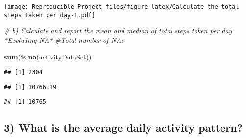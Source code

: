 \documentclass[
]{article}
\newenvironment{Shaded}{\begin{snugshade}}{\end{snugshade}}
\newcommand{\CommentTok}[1]{\textcolor[rgb]{0.56,0.35,0.01}{\textit{#1}}}
\newcommand{\DataTypeTok}[1]{\textcolor[rgb]{0.13,0.29,0.53}{#1}}
\newcommand{\KeywordTok}[1]{\textcolor[rgb]{0.13,0.29,0.53}{\textbf{#1}}}
\newcommand{\NormalTok}[1]{#1}
\newcommand{\OperatorTok}[1]{\textcolor[rgb]{0.81,0.36,0.00}{\textbf{#1}}}
\newcommand{\OtherTok}[1]{\textcolor[rgb]{0.56,0.35,0.01}{#1}}
\newcommand{\StringTok}[1]{\textcolor[rgb]{0.31,0.60,0.02}{#1}}
\begin{document}
\texttt{[image: Reproducible-Project\_files/figure-latex/Calculate the total steps taken per day-1.pdf]}

\begin{Shaded}
\begin{Highlighting}[]
\CommentTok{# b) Calculate and report the mean and median of total steps taken per day *Excluding NA*}
\CommentTok{#Total number of NAs}

\KeywordTok{sum}\NormalTok{(}\KeywordTok{is.na}\NormalTok{(activityDataSet))}
\end{Highlighting}
\end{Shaded}

\begin{verbatim}
## [1] 2304
\end{verbatim}

\begin{Shaded}
\end{Shaded}

\begin{verbatim}
## [1] 10766.19
\end{verbatim}

\begin{Shaded}
\end{Shaded}

\begin{verbatim}
## [1] 10765
\end{verbatim}

\hypertarget{what-is-the-average-daily-activity-pattern}{%
\subsection{3) What is the average daily activity
pattern?}\label{what-is-the-average-daily-activity-pattern}}
\end{document}
